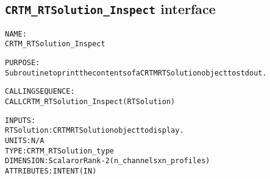 \subsection{\texttt{CRTM\_RTSolution\_Inspect} interface}
  \label{sec:CRTM_RTSolution_Inspect_interface}
  \begin{alltt}
 
  NAME:
        CRTM_RTSolution_Inspect
 
  PURPOSE:
        Subroutine to print the contents of a CRTM RTSolution object to stdout.
 
  CALLING SEQUENCE:
        CALL CRTM_RTSolution_Inspect( RTSolution )
 
  INPUTS:
        RTSolution:    CRTM RTSolution object to display.
                       UNITS:      N/A
                       TYPE:       CRTM_RTSolution_type
                       DIMENSION:  Scalar or Rank-2 (n_channels x n_profiles)
                       ATTRIBUTES: INTENT(IN)
 
  \end{alltt}
